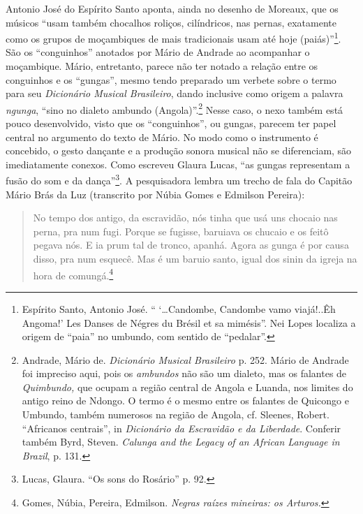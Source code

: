 Antonio José do Espírito Santo aponta, ainda no desenho de Moreaux, que
os músicos ``usam também chocalhos roliços, cilíndricos, nas pernas,
exatamente como os grupos de moçambiques de  mais tradicionais usam
até hoje (paiás)''\footnote{Espírito Santo, Antonio José. ``
  `\ldots{}Candombe, Candombe vamo viajá!..Êh Angoma!' Les Danses de
  Négres du Brésil et sa mimésis''. Nei Lopes localiza a origem de
  ``paia'' no umbundo, com sentido de ``pedalar''.}. São os
``conguinhos'' anotados por Mário de Andrade ao acompanhar o moçambique.
Mário, entretanto, parece não ter notado a relação entre os conguinhos e
os ``gungas'', mesmo tendo preparado um verbete sobre o termo para seu
\emph{Dicionário Musical Brasileiro}, dando inclusive como origem a
palavra \emph{ngunga}, ``sino no dialeto ambundo (Angola)''.\footnote{Andrade,
  Mário de. \emph{Dicionário Musical Brasileiro} p. 252. Mário de
  Andrade foi impreciso aqui, pois os \emph{ambundos} não são um
  dialeto, mas os falantes de \emph{Quimbundo,} que ocupam a região
  central de Angola e Luanda, nos limites do antigo reino de Ndongo. O
  termo é o mesmo entre os falantes de Quicongo e Umbundo, também
  numerosos na região de Angola, cf. Sleenes, Robert. ``Africanos
  centrais'', in \emph{Dicionário da Escravidão e da Liberdade}.
  Conferir também Byrd, Steven. \emph{Calunga and the Legacy of an
  African Language in Brazil}, p. 131.} Nesse caso, o nexo também está
pouco desenvolvido, visto que os ``conguinhos'', ou gungas, parecem ter
papel central no argumento do texto de Mário. No modo como o instrumento
é concebido, o gesto dançante e a produção sonora musical não se
diferenciam, são imediatamente conexos. Como escreveu Glaura Lucas, ``as
gungas representam a fusão do som e da dança''\footnote{Lucas, Glaura.
  ``Os sons do Rosário'' p. 92.}. A pesquisadora lembra um trecho de
fala do Capitão Mário Brás da Luz (transcrito por Núbia Gomes e Edmilson
Pereira):

\begin{quote}
No tempo dos antigo, da escravidão, nós tinha que usá uns chocaio nas
perna, pra num fugi. Porque se fugisse, baruiava os chucaio e os feitô
pegava nós. E ia prum tal de tronco, apanhá. Agora as gunga é por causa
disso, pra num esquecê. Mas é um baruio santo, igual dos sinin da igreja
na hora de comungá.\footnote{Gomes, Núbia, Pereira, Edmilson.
  \emph{Negras raízes mineiras: os Arturos.}}
\end{quote}

